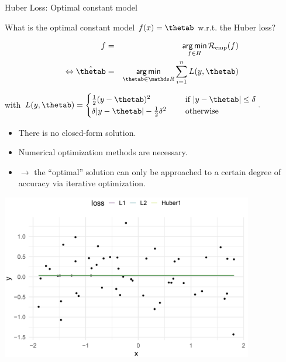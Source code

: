 \begin{vbframe}{Huber Loss: Optimal constant model}

What is the optimal constant model $\fx = \thetab$ w.r.t. the Huber loss?

\vspace{-0.2cm}
\begin{eqnarray*}
f &=& \argmin_{f \in \Hspace} \riskef\\
\Leftrightarrow
\hat \thetab&=& \argmin_{\thetab\in \R} \sumin L(y, \thetab)
\end{eqnarray*}

with $L(y, \thetab) = \begin{cases}
  \frac{1}{2}(y - \thetab)^2  & \text{ if } |y - \thetab| \le \delta \\
  \delta |y - \thetab|-\frac{1}{2}\delta^2 \quad & \text{ otherwise }
  \end{cases}. $

\begin{itemize}
\item There is no closed-form solution.
\item Numerical optimization methods are necessary.
\item $\to$  the \enquote{optimal} solution can only be approached to a certain degree of accuracy via iterative optimization.
\end{itemize}


\framebreak

\vspace{0.2cm}

\begin{center}
\includegraphics[width = 11cm ]{figure_man/Huber1.png} \\
\end{center}


\framebreak 


\end{vbframe}
